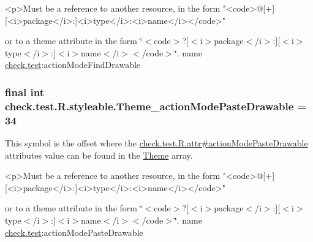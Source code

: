 \begin{DoxyVerb}      <p>Must be a reference to another resource, in the form "<code>@[+][<i>package</i>:]<i>type</i>:<i>name</i></code>"
\end{DoxyVerb}
 or to a theme attribute in the form \char`\"{}$<$code$>$?\mbox{[}$<$i$>$package$<$/i$>$\+:\mbox{]}\mbox{[}$<$i$>$type$<$/i$>$\+:\mbox{]}$<$i$>$name$<$/i$>$$<$/code$>$\char`\"{}.  name \hyperlink{namespacecheck_1_1test}{check.\+test}\+:action\+Mode\+Find\+Drawable \hypertarget{classcheck_1_1test_1_1_r_1_1styleable_a537cf24632f0159627a389b005b5ad7d}{}
\subsubsection[{Theme\+\_\+action\+Mode\+Paste\+Drawable}]{\setlength{\rightskip}{0pt plus 5cm}final int check.\+test.\+R.\+styleable.\+Theme\+\_\+action\+Mode\+Paste\+Drawable = 34\hspace{0.3cm}{\ttfamily [static]}}\label{classcheck_1_1test_1_1_r_1_1styleable_a537cf24632f0159627a389b005b5ad7d}
This symbol is the offset where the \hyperlink{classcheck_1_1test_1_1_r_1_1attr_aff7427a6bcd20189d4b6af36b92fccdd}{check.\+test.\+R.\+attr\#action\+Mode\+Paste\+Drawable} attribute\textquotesingle{}s value can be found in the \hyperlink{classcheck_1_1test_1_1_r_1_1styleable_acca726d02016a0cf607782ec3a436a81}{Theme} array.

\begin{DoxyVerb}      <p>Must be a reference to another resource, in the form "<code>@[+][<i>package</i>:]<i>type</i>:<i>name</i></code>"
\end{DoxyVerb}
 or to a theme attribute in the form \char`\"{}$<$code$>$?\mbox{[}$<$i$>$package$<$/i$>$\+:\mbox{]}\mbox{[}$<$i$>$type$<$/i$>$\+:\mbox{]}$<$i$>$name$<$/i$>$$<$/code$>$\char`\"{}.  name \hyperlink{namespacecheck_1_1test}{check.\+test}\+:action\+Mode\+Paste\+Drawable \hypertarget{classcheck_1_1test_1_1_r_1_1styleable_a7430b605b613f3c152e57fba4ec0f106}{}
